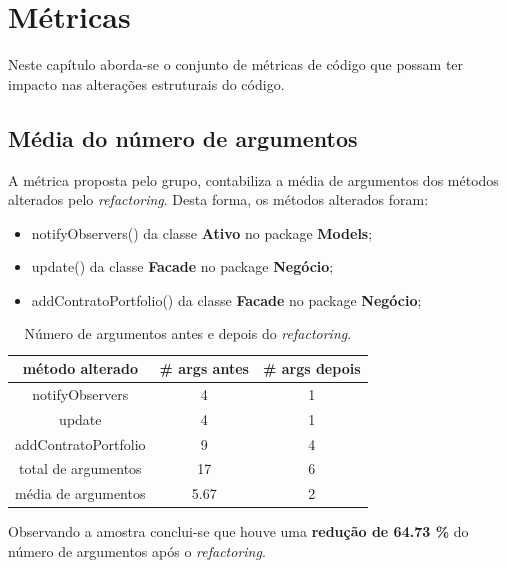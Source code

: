 \chapter{Métricas}
\hspace{5mm} Neste capítulo aborda-se o conjunto de métricas de código que possam ter impacto nas alterações estruturais do código.

\section{Média do número de argumentos}

\hspace{5mm} A métrica proposta pelo grupo, contabiliza a média de argumentos dos métodos alterados pelo \emph{refactoring}. Desta forma, os métodos alterados foram:

\begin{itemize}
    \item notifyObservers() da classe \textbf{Ativo} no package \textbf{Models};
    \item update() da classe \textbf{Facade} no package \textbf{Negócio};
    \item addContratoPortfolio() da classe \textbf{Facade} no package \textbf{Negócio};
\end{itemize}{}
\hspace{5mm}

\begin{table}[H]
    \centering
    \begin{tabular}{|c|c|c|}
    \hline
        método alterado & \# args antes & \# args depois \\ 
        \hline 
        notifyObservers & 4 & 1 \\ 
        \hline
        update & 4 & 1 \\ 
        \hline
        addContratoPortfolio & 9 & 4 \\ 
        \hline
        \hline
        total de argumentos & 17 & 6 \\
        \hline
        média de argumentos & 5.67 & 2 \\
        \hline
    \end{tabular}
    \caption{Número de argumentos antes e depois do \textit{refactoring}.}
    \label{tab:testeFront}
\end{table}

\hspace{5mm} Observando a amostra conclui-se que houve uma \textbf{redução de 64.73 \%} do número de argumentos após o \textit{refactoring}.

